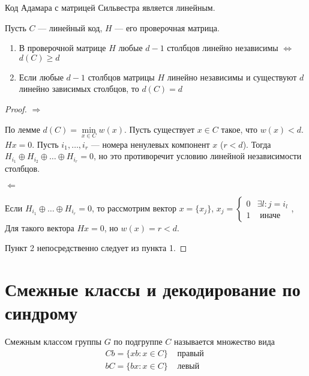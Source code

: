 \begin{corollary}
Код Адамара с матрицей Сильвестра является линейным.
\end{corollary}

\begin{theorem}
Пусть $C$ --- линейный код, $H$ --- его проверочная матрица.
\begin{enumerate}
\item В проверочной матрице $H$  любые $d-1$ столбцов
линейно независимы $\iff$ $d(C) \ge d$
\item Если любые $d-1$ столбцов матрицы $H$ линейно независимы и
существуют $d$ линейно зависимых столбцов, то $d(C) = d$
\end{enumerate}
\end{theorem}

\begin{proof}

$\Rightarrow$

По лемме $d(C) = \min\limits_{x \in C} w(x)$. Пусть существует
$x \in C$ такое, что $w(x) < d$. $Hx = 0$. Пусть $i_1, \ldots, i_r$
--- номера ненулевых компонент $x$ ($r < d$). Тогда
 $H_{i_1} \oplus H_{i_2} \oplus \ldots \oplus H_{i_r} = 0$,
 но это противоречит условию линейной независимости столбцов.
 
$\Leftarrow$

Если $H_{i_1} \oplus \ldots \oplus H_{i_r} = 0$, то
рассмотрим вектор $x = \{x_j\}$, 
$x_j = \begin{cases} 0 & \exists l \colon j = i_l \\
                     1 & \text{ иначе} \end{cases}$,
Для такого вектора $Hx = 0$, но $w(x) = r < d$.

Пункт 2 непосредственно следует из пункта 1.
\end{proof}

\section{Смежные классы и декодирование по синдрому}

\begin{definition}
Смежным классом группы $G$ по подгруппе $C$ называется множество вида
$$\begin{array}{rl}Cb = \{x b \colon x \in C\} & \text{ правый } \\
                  bC= \{ b x \colon x \in C\} & \text{ левый }
\end{array}$$
\end{definition}

